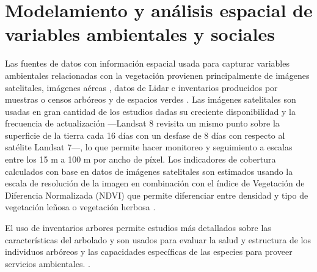\documentclass[12pt,]{book}
\begin{document}
\section{Modelamiento y análisis espacial de variables ambientales y
sociales}\label{modelamiento-y-analisis-espacial-de-variables-ambientales-y-sociales}

Las fuentes de datos con información espacial usada para capturar
variables ambientales relacionadas con la vegetación provienen
principalmente de imágenes
satelitales\citep{landry_street_2009, troy_predicting_2007, vasquez_fuentes_vegetacion_2008, nesbitt_exploring_2016},
imágenes aéreas
\citep{azocar_urbanization_2007, heynen_political_2006, tratalos_urban_2007},
datos de Lidar \citep{shanahan_socio-economic_2014, schwarz_trees_2015}
e inventarios producidos por muestras o censos arbóreos y de espacios
verdes
\citetext{\citealp{comber_using_2008}; \citealp{killicoat_economic_2002}; \citealp[\citet{nowak_carbon_2002}]{nowak_urban_2000}; \citealp{talen_assessing_1998}}.
Las imágenes satelitales son usadas en gran cantidad de los estudios
dadas su creciente disponibilidad y la frecuencia de actualización
---Landsat 8 revisita un mismo punto sobre la superficie de la tierra
cada 16 días con un desfase de 8 días con respecto al satélite Landsat
7---, lo que permite hacer monitoreo y seguimiento a escalas entre los
15 m a 100 m por ancho de píxel. Los indicadores de cobertura calculados
con base en datos de imágenes satelitales son estimados usando la escala
de resolución de la imagen en combinación con el índice de Vegetación de
Diferencia Normalizada (NDVI) que permite diferenciar entre densidad y
tipo de vegetación leñosa o vegetación herbosa
\citep{nesbitt_exploring_2016}.

El uso de inventarios arbores permite estudios más detallados sobre las
características del arbolado y son usados para evaluar la salud y
estructura de los individuos arbóreos y las capacidades específicas de
las especies para proveer servicios ambientales.
\citep{killicoat_economic_2002, nowak_carbon_2002, cowett_methodology_2014}.
\end{document}
